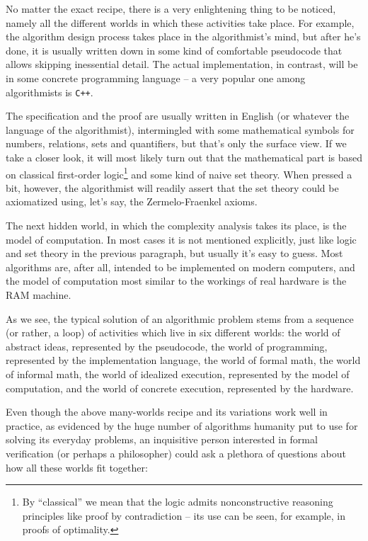\documentclass[declaration,mgr,english,shortabstract]{iithesis}
\newcommand{\m}[1]{\texttt{#1}}
\begin{document}
No matter the exact recipe, there is a very enlightening thing to be noticed, namely all the different worlds in which these activities take place. For example, the algorithm design process takes place in the algorithmist's mind, but after he's done, it is usually written down in some kind of comfortable pseudocode that allows skipping inessential detail. The actual implementation, in contrast, will be in some concrete programming language -- a very popular one among algorithmists is \m{C++}.

The specification and the proof are usually written in English (or whatever the language of the algorithmist), intermingled with some mathematical symbols for numbers, relations, sets and quantifiers, but that's only the surface view. If we take a closer look, it will most likely turn out that the mathematical part is based on classical first-order logic\footnote{By ``classical'' we mean that the logic admits nonconstructive reasoning principles like proof by contradiction \cite{ProofByContradiction} -- its use can be seen, for example, in proofs of optimality.} and some kind of naive set theory. When pressed a bit, however, the algorithmist will readily assert that the set theory could be axiomatized using, let's say, the Zermelo-Fraenkel axioms.

The next hidden world, in which the complexity analysis takes its place, is the model of computation. In most cases it is not mentioned explicitly, just like logic and set theory in the previous paragraph, but usually it's easy to guess. Most algorithms are, after all, intended to be implemented on modern computers, and the model of computation most similar to the workings of real hardware is the RAM machine.

As we see, the typical solution of an algorithmic problem stems from a sequence (or rather, a loop) of activities which live in six different worlds: the world of abstract ideas, represented by the pseudocode, the world of programming, represented by the implementation language, the world of formal math, the world of informal math, the world of idealized execution, represented by the model of computation, and the world of concrete execution, represented by the hardware.

Even though the above many-worlds recipe and its variations work well in practice, as evidenced by the huge number of algorithms humanity put to use for solving its everyday problems, an inquisitive person interested in formal verification (or perhaps a philosopher) could ask a plethora of questions about how all these worlds fit together:
\end{document}
